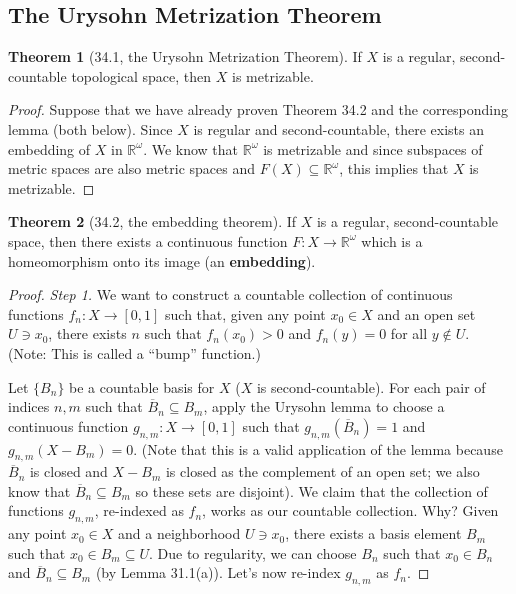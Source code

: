 \documentclass{article}
\newcommand{\nline}{\vspace*{0.5\baselineskip}}
\theoremstyle{definition}
\newtheorem{theorem}{Theorem}[subsection]
\begin{document}
\begin{flushleft}
\subsection{The Urysohn Metrization Theorem}

\begin{theorem}[34.1, the Urysohn Metrization Theorem]
If $X$ is a regular, second-countable topological space, then $X$ is metrizable.
\end{theorem}

\begin{proof}
Suppose that we have already proven Theorem 34.2 and the corresponding lemma (both below). Since $X$ is regular and second-countable, there exists an embedding of $X$ in $\mathbb{R}^\omega$. We know that $\mathbb{R}^\omega$ is metrizable and since subspaces of metric spaces are also metric spaces and $F(X) \subseteq \mathbb{R}^\omega$, this implies that $X$ is metrizable.
\end{proof}

\begin{theorem}[34.2, the embedding theorem]
If $X$ is a regular, second-countable space, then there exists a continuous function $F: X \to \mathbb{R}^\omega$ which is a homeomorphism onto its image (an \textbf{embedding}).
\end{theorem}

\begin{proof}
\textit{Step 1.} We want to construct a countable collection of continuous functions $f_n : X \to [0,1]$ such that, given any point $x_0 \in X$ and an open set $U \ni x_0$, there exists $n$ such that $f_n(x_0) > 0$ and $f_n(y) = 0$ for all $y \notin U$. (Note: This is called a ``bump'' function.)

\nline

Let $\{B_n\}$ be a countable basis for $X$ ($X$ is second-countable). For each pair of indices $n, m$ such that $\overline{B}_n \subseteq B_m$, apply the Urysohn lemma to choose a continuous function $g_{n,m}: X \to [0,1]$ such that $g_{n,m}(\overline{B}_n) = 1$ and $g_{n,m}(X - B_m) = 0$. (Note that this is a valid application of the lemma because $\overline{B}_n$ is closed and $X - B_m$ is closed as the complement of an open set; we also know that $\overline{B}_n \subseteq B_m$ so these sets are disjoint). We claim that the collection of functions $g_{n,m}$, re-indexed as $f_n$, works as our countable collection. Why? Given any point $x_0 \in X$ and a neighborhood $U \ni x_0$, there exists a basis element $B_m$ such that $x_0 \in B_m \subseteq U$. Due to regularity, we can choose $B_n$ such that $x_0 \in B_n$ and $\overline{B}_n \subseteq B_m$ (by Lemma 31.1(a)). Let's now re-index $g_{n,m}$ as $f_n$.


\end{proof}
\end{flushleft}
\end{document}
